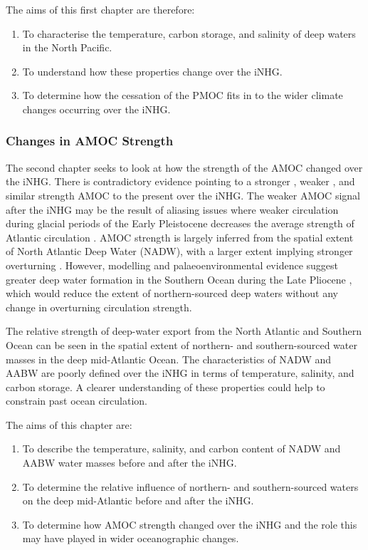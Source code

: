 The aims of this first chapter are therefore:
\begin{enumerate}
	\item To characterise the temperature, carbon storage, and salinity of deep waters in the North Pacific.
	\item To understand how these properties change over the iNHG.
	\item To determine how the cessation of the PMOC fits in to the wider climate changes occurring over the iNHG. 
\end{enumerate}

\subsubsection{Changes in AMOC Strength}

The second chapter seeks to look at how the strength of the AMOC changed over the iNHG. There is contradictory evidence pointing to a stronger \citep{hayashiLatestPlioceneNorthern2020}, weaker \citep{langIncursionsSouthernsourcedWater2016}, and similar strength \citep{hodellHighResolutionStableIsotopic1992} AMOC to the present over the iNHG. The weaker AMOC signal after the iNHG may be the result of aliasing issues where weaker circulation during glacial periods of the Early Pleistocene decreases the average strength of Atlantic circulation \citep{raymoResponseDeepOcean1992}. AMOC strength is largely inferred from the spatial extent of North Atlantic Deep Water (NADW), with a larger extent implying stronger overturning \citep{hodellHighResolutionStableIsotopic1992,raymoResponseDeepOcean1992, langIncursionsSouthernsourcedWater2016}. However, modelling and palaeoenvironmental evidence suggest greater deep water formation in the Southern Ocean during the Late Pliocene \citep{hillModelledOceanChanges2017, mckayAntarcticSouthernOcean2012}, which would reduce the extent of northern-sourced deep waters without any change in overturning circulation strength.

The relative strength of deep-water export from the North Atlantic and Southern Ocean can be seen in the spatial extent of northern- and southern-sourced water masses in the deep mid-Atlantic Ocean. The characteristics of NADW and AABW are poorly defined over the iNHG in terms of temperature, salinity, and carbon storage. A clearer understanding of these properties could help to constrain past ocean circulation.

The aims of this chapter are:
\begin{enumerate}
	\item To describe the temperature, salinity, and carbon content of NADW and AABW water masses before and after the iNHG.
	\item To determine the relative influence of northern- and southern-sourced waters on the deep mid-Atlantic before and after the iNHG.
	\item To determine how AMOC strength changed over the iNHG and the role this may have played in wider oceanographic changes.
\end{enumerate}

